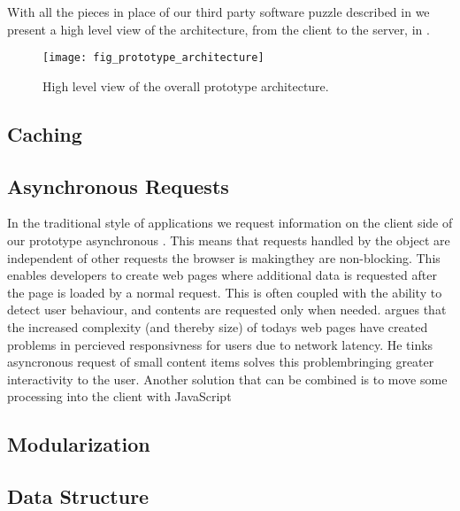 With all the pieces in place of our third party software puzzle described in
we present a high level view of the architecture, from the client to the
server, in
.

\begin{figure}
  \begin{whole}
    \centering
    \texttt{[image: fig\_prototype\_architecture]}
    \caption[Prototype Architecture]{
      High level view of the overall prototype architecture.
    }
    \label{figure:fig.prototype.architecture}
  \end{whole}
\end{figure}

\subsection{Caching}

\subsection{Asynchronous Requests}

In the traditional style of  applications we request information on
the client side of our prototype asynchronous%
.
This means that requests handled by the  object
are independent of other requests the browser is making\dash{}they
are non-blocking. This enables developers to create web pages where additional
data is requested after the page is loaded by a normal  request.
This is often coupled with the ability to detect user behaviour, and contents
are requested only when needed. \citet[pp.281--282]{stamey06} argues that
the increased complexity (and thereby size) of todays web pages have created
problems in percieved responsivness for users due to network latency. He
tinks asyncronous request of small content items solves this
problem\dash{}bringing greater interactivity to the user. Another solution
that can be combined is to move some processing into the client with
JavaScript \citep[]{jazayeri07}

\subsection{Modularization}


\subsection{Data Structure}
